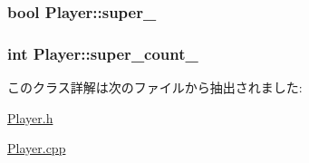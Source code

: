 \hypertarget{class_player_a36ffd35693d223b63089517cc059f98a}{
\subsubsection[{super\+\_\+}]{\setlength{\rightskip}{0pt plus 5cm}bool Player\+::super\+\_\+\hspace{0.3cm}{\ttfamily [private]}}}\label{class_player_a36ffd35693d223b63089517cc059f98a}
\hypertarget{class_player_a141db66821f18e72907efd017533603f}{
\subsubsection[{super\+\_\+count\+\_\+}]{\setlength{\rightskip}{0pt plus 5cm}int Player\+::super\+\_\+count\+\_\+\hspace{0.3cm}{\ttfamily [private]}}}\label{class_player_a141db66821f18e72907efd017533603f}


このクラス詳解は次のファイルから抽出されました\+:\begin{DoxyCompactItemize}
\item 
\hyperlink{_player_8h}{Player.\+h}\item 
\hyperlink{_player_8cpp}{Player.\+cpp}\end{DoxyCompactItemize}
